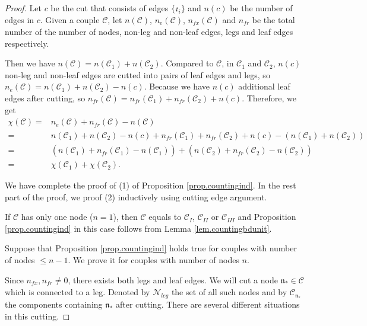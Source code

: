 \begin{proof}
Let $c$ be the cut that consists of edges $\{\mathfrak{e}_{i}\}$ and $n(c)$ be the number of edges in $c$. Given a couple $\mathcal{C}$, let $n(\mathcal{C})$, $n_e(\mathcal{C})$, $n_{\textit{fx}}(\mathcal{C})$ and $n_{\textit{fr}}$ be the total number of the number of nodes, non-leg and non-leaf edges, legs and leaf edges respectively. 

Then we have $n(\mathcal{C})=n(\mathcal{C}_1)+n(\mathcal{C}_2)$. Compared to $\mathcal{C}$, in $\mathcal{C}_1$ and $\mathcal{C}_2$, $n(c)$ non-leg and non-leaf edges are cutted into pairs of leaf edges and legs, so $n_e(\mathcal{C})=n(\mathcal{C}_1)+n(\mathcal{C}_2)-n(c)$. Because we have $n(c)$ additional leaf edges after cutting, so $n_{\textit{fr}}(\mathcal{C})=n_{\textit{fr}}(\mathcal{C}_1)+n_{\textit{fr}}(\mathcal{C}_2)+n(c)$. Therefore, we get
\begin{equation}
\begin{split}
    \chi(\mathcal{C})=&n_e(\mathcal{C})+n_{\textit{fr}}(\mathcal{C})-n(\mathcal{C})
    \\
    =&n(\mathcal{C}_1)+n(\mathcal{C}_2)-n(c)+n_{\textit{fr}}(\mathcal{C}_1)+n_{\textit{fr}}(\mathcal{C}_2)+n(c)-(n(\mathcal{C}_1)+n(\mathcal{C}_2))
    \\
    =&(n(\mathcal{C}_1)+n_{\textit{fr}}(\mathcal{C}_1)-n(\mathcal{C}_1))+(n(\mathcal{C}_2)+n_{\textit{fr}}(\mathcal{C}_2)-n(\mathcal{C}_2))
    \\
    =&\chi(\mathcal{C}_1)+\chi(\mathcal{C}_2).
\end{split}
\end{equation}

We have complete the proof of (1) of Proposition \ref{prop.countingind}. In the rest part of the proof, we proof (2) inductively using cutting edge argument.

If $\mathcal{C}$ has only one node ($n=1$), then $\mathcal{C}$ equals to $\mathcal{C}_{I}$, $\mathcal{C}_{II}$ or $\mathcal{C}_{III}$ and Proposition \ref{prop.countingind} in this case follows from Lemma \ref{lem.countingbdunit}.

Suppose that Proposition \ref{prop.countingind} holds true for couples with number of nodes $\le n-1$. We prove it for couples with number of nodes $n$. 

Since $n_{\textit{fx}}, n_{\textit{fr}}\ne 0$, there exists both legs and leaf edges. We will cut a node $\mathfrak{n}_*\in\mathcal{C}$ which is connected to a leg. Denoted by $\mathcal{N}_{leg}$ the set of all such nodes and by $\mathcal{C}_{\mathfrak{n}_*}$ the components containing $\mathfrak{n}_*$ after cutting. There are several different situations in this cutting.


\end{proof}
